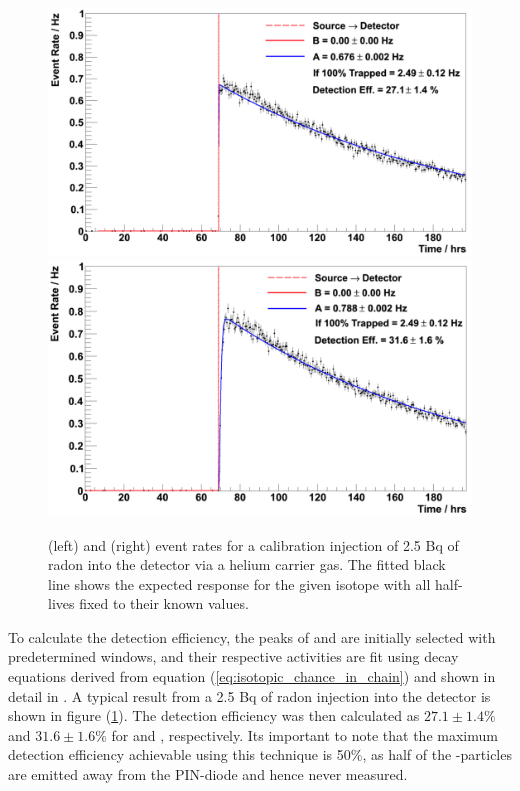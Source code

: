 \begin{figure}[b!]
    \centering
    \includegraphics[scale=0.23]{Chapter_4/Figures/Po_218_Calibration.png}
    \includegraphics[scale=0.23]{Chapter_4/Figures/Po_214_Calibration.png}
    \caption[\PoTOE{} and \PoTOF{} event rates for a calibration injection of 2.5 Bq of radon into the detector via a helium carrier gas.]
    {\PoTOE{} (left) and \PoTOF{} (right) event rates for a calibration injection of 2.5 Bq of radon into the detector via a helium carrier gas. The fitted black line shows the expected response for the given isotope with all half-lives fixed to their known values.}
    \label{fig:calibration_decay_fit}
\end{figure}
%

To calculate the detection efficiency, the peaks of \PoTOE{} and \PoTOF{} are initially selected with predetermined windows, and their respective activities are fit using decay equations derived from equation (\ref{eq:isotopic_chance_in_chain}) and shown in detail in \cite{mott_2013}. A typical result from a 2.5 Bq of radon injection into the detector is shown in figure (\ref{fig:calibration_decay_fit}). The detection efficiency was then calculated as $27.1\pm1.4\%$ and $31.6\pm1.6\%$ for \PoTOE{} and \PoTOF{}, respectively. Its important to note that the maximum detection efficiency achievable using this technique is 50\%, as half of the \alpha{}-particles are emitted away from the PIN-diode and hence never measured. 


